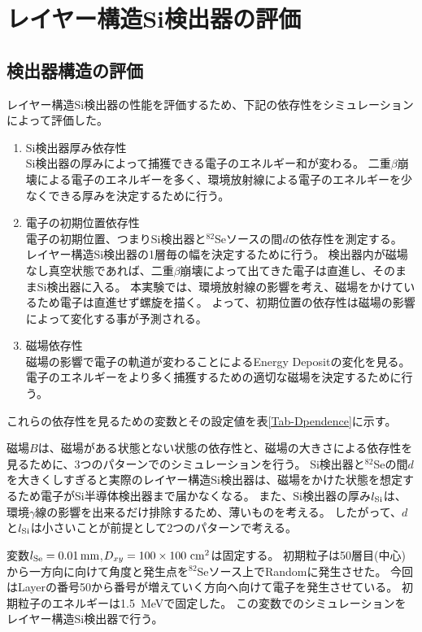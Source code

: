 \documentclass[a4paper,10pt]{jreport}
\begin{document}
\chapter{レイヤー構造Si検出器の評価}




\section{検出器構造の評価}

レイヤー構造Si検出器の性能を評価するため、下記の依存性をシミュレーションによって評価した。

\begin{enumerate}
	\item Si検出器厚み依存性 \\
	Si検出器の厚みによって捕獲できる電子のエネルギー和が変わる。
	二重$\beta$崩壊による電子のエネルギーを多く、環境放射線による電子のエネルギーを少なくできる厚みを決定するために行う。
	
	\item 電子の初期位置依存性 \\
	電子の初期位置、つまりSi検出器と$^{82}$Seソースの間$d$の依存性を測定する。
	レイヤー構造Si検出器の1層毎の幅を決定するために行う。
	検出器内が磁場なし真空状態であれば、二重$\beta$崩壊によって出てきた電子は直進し、そのままSi検出器に入る。
	本実験では、環境放射線の影響を考え、磁場をかけているため電子は直進せず螺旋を描く。
	よって、初期位置の依存性は磁場の影響によって変化する事が予測される。
	
	\item 磁場依存性 \\
	磁場の影響で電子の軌道が変わることによるEnergy Depositの変化を見る。
	電子のエネルギーをより多く捕獲するための適切な磁場を決定するために行う。
\end{enumerate}

これらの依存性を見るための変数とその設定値を表\ref{Tab-Dpendence}に示す。

磁場$B$は、磁場がある状態とない状態の依存性と、磁場の大きさによる依存性を見るために、3つのパターンでのシミュレーションを行う。
Si検出器と$^{82}$Seの間$d$を大きくしすぎると実際のレイヤー構造Si検出器は、磁場をかけた状態を想定するため電子がSi半導体検出器まで届かなくなる。
また、Si検出器の厚み$l_{\rm{Si}}$は、環境$\gamma$線の影響を出来るだけ排除するため、薄いものを考える。
したがって、$d$と$l_{\rm{Si}}$は小さいことが前提として2つのパターンで考える。

変数$l_{\rm{Se}} = \SI{0.01}{mm}$,$D_{xy} =100\times100\ \rm{cm}^2$は固定する。
初期粒子は50層目(中心)から一方向に向けて角度と発生点を$^{82}$Seソース上でRandomに発生させた。
今回はLayerの番号50から番号が増えていく方向へ向けて電子を発生させている。
初期粒子のエネルギーは\SI{1.5}{MeV}で固定した。
この変数でのシミュレーションをレイヤー構造Si検出器で行う。
\end{document}
